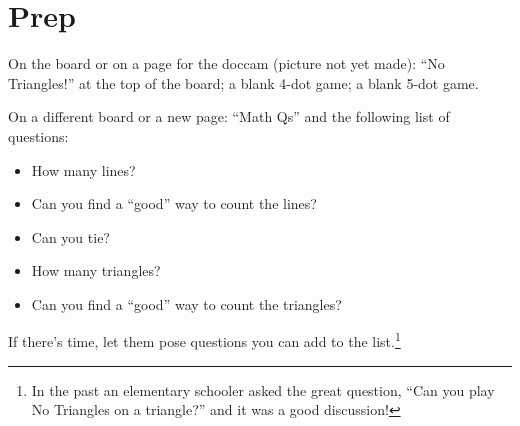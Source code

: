 \documentclass{article}
\begin{document}
    \section{Prep}

    On the board or on a page for the doccam (picture not yet made): ``No Triangles!'' at the top of the board; a blank 4-dot game; a blank 5-dot game.
    
    On a different board or a new page: ``Math Qs'' and the following list of questions:
    \begin{itemize}
        \item How many lines?
        \item Can you find a ``good'' way to count the lines?
        \item Can you tie?
        \item How many triangles?
        \item Can you find a ``good'' way to count the triangles?
    \end{itemize}
    
    If there's time, let them pose questions you can add to the list.\footnote{In the past an elementary schooler asked the great question, ``Can you play No Triangles on a triangle?'' and it was a good discussion!}
     
\end{document}
